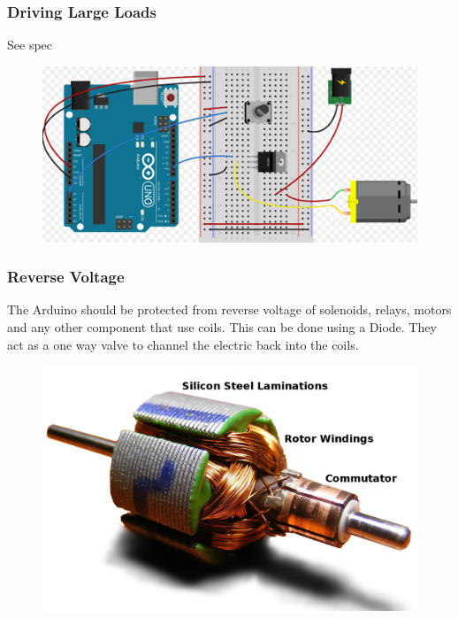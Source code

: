 \begin{frame}
	\frametitle{Driving Large Loads}
	See spec
	\begin{figure}
   		\includegraphics[scale=.6]{assets/loads} 
	\end{figure}
\end{frame}

\begin{frame}
	\frametitle{Reverse Voltage}
	The Arduino should be protected from reverse voltage of solenoids, relays, motors and any other component that use coils. This can be done using a Diode. They act as a one way valve to channel the electric back into the coils. 
	\begin{figure}
   		\includegraphics[scale=.2]{assets/motor} 
	\end{figure}
\end{frame}

